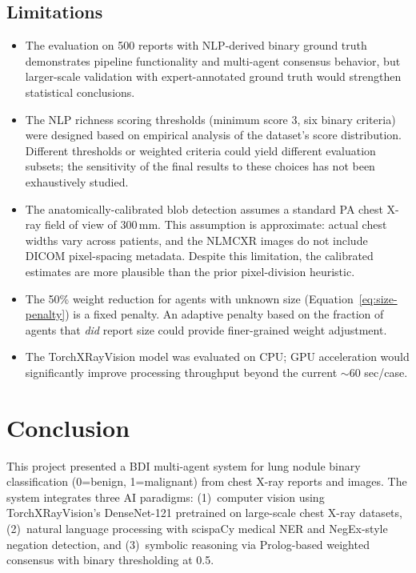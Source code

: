 \documentclass[12pt]{article}
\begin{document}
\subsection{Limitations}
\label{subsec:limitations}

\begin{itemize}
    \item The evaluation on 500 reports with NLP-derived binary ground truth demonstrates pipeline functionality and multi-agent consensus behavior, but larger-scale validation with expert-annotated ground truth would strengthen statistical conclusions.
    \item The NLP richness scoring thresholds (minimum score 3, six binary criteria) were designed based on empirical analysis of the dataset's score distribution. Different thresholds or weighted criteria could yield different evaluation subsets; the sensitivity of the final results to these choices has not been exhaustively studied.
    \item The anatomically-calibrated blob detection assumes a standard PA chest X-ray field of view of 300\,mm. This assumption is approximate: actual chest widths vary across patients, and the NLMCXR images do not include DICOM pixel-spacing metadata. Despite this limitation, the calibrated estimates are more plausible than the prior pixel-division heuristic.
    \item The 50\% weight reduction for agents with unknown size (Equation~\ref{eq:size-penalty}) is a fixed penalty. An adaptive penalty based on the fraction of agents that \emph{did} report size could provide finer-grained weight adjustment.
    \item The TorchXRayVision model was evaluated on CPU; GPU acceleration would significantly improve processing throughput beyond the current $\sim$60 sec/case.
\end{itemize}


\section{Conclusion}
\label{sec:conclusion}

This project presented a BDI multi-agent system for lung nodule binary classification (0=benign, 1=malignant) from chest X-ray reports and images. The system integrates three AI paradigms: (1)~computer vision using TorchXRayVision's DenseNet-121 pretrained on large-scale chest X-ray datasets, (2)~natural language processing with scispaCy medical NER and NegEx-style negation detection, and (3)~symbolic reasoning via Prolog-based weighted consensus with binary thresholding at 0.5.
\end{document}
